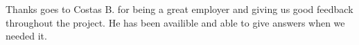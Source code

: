 Thanks goes to Costas B. for being a great employer and giving us good feedback
throughout the project. He has been availible and able to give answers when we
needed it.